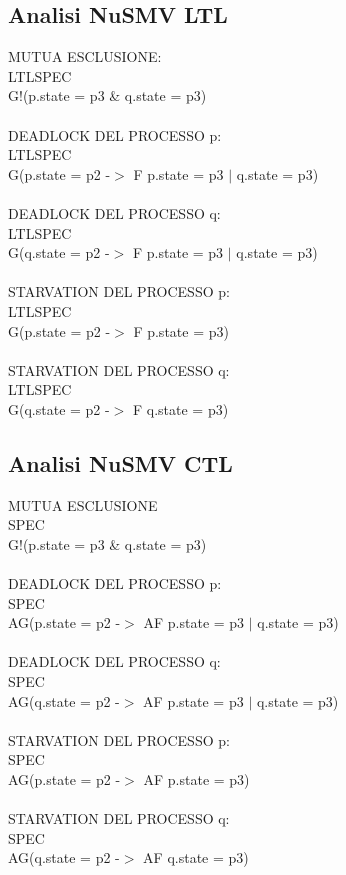 \documentclass{article}
\begin{document}
\subsection{Analisi NuSMV LTL}
MUTUA ESCLUSIONE:
\\LTLSPEC
\\G!(p.state = p3 \& q.state = p3)
\\\\DEADLOCK DEL PROCESSO p:
\\LTLSPEC
\\G(p.state = p2 -$>$ F p.state = p3 $|$ q.state = p3)
\\\\DEADLOCK DEL PROCESSO q:
\\LTLSPEC
\\G(q.state = p2 -$>$ F p.state = p3 $|$ q.state = p3)
\\\\STARVATION DEL PROCESSO p:
\\LTLSPEC
\\G(p.state = p2 -$>$ F p.state = p3)
\\\\STARVATION DEL PROCESSO q:
\\LTLSPEC
\\G(q.state = p2 -$>$ F q.state = p3)
\subsection{Analisi NuSMV CTL}
MUTUA ESCLUSIONE
\\SPEC
\\G!(p.state = p3 \& q.state = p3)
\\\\DEADLOCK DEL PROCESSO p:
\\SPEC
\\AG(p.state = p2 -$>$ AF p.state = p3 $|$ q.state = p3)
\\\\DEADLOCK DEL PROCESSO q:
\\SPEC
\\AG(q.state = p2 -$>$ AF p.state = p3 $|$ q.state = p3)
\\\\STARVATION DEL PROCESSO p:
\\SPEC
\\AG(p.state = p2 -$>$ AF p.state = p3)
\\\\STARVATION DEL PROCESSO q:
\\SPEC
\\AG(q.state = p2 -$>$ AF q.state = p3)
\end{document}
